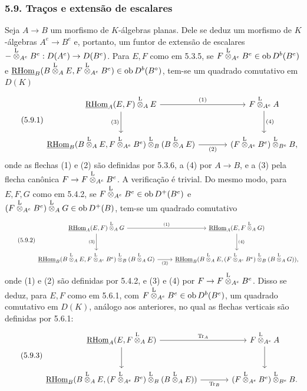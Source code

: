 \subsubsection*{5.9. Traços e extensão de escalares}

Seja $A\to B$ um morfismo de $K$-álgebras planas. Dele se deduz um morfismo de $K$-álgebras $A^e\to B^e$ e, portanto, um funtor de extensão de escalares $-\overset{\mathrm L}{\otimes}_{A^e}B^e:D(A^e)\to D(B^e)$. Para $E,F$ como em 5.3.5, se $F\overset{\mathrm L}{\otimes}_{A^e}B^e\in\operatorname{ob} D^b(B^e)$ e $\underline{\mathrm{RHom}}_B(B\overset{\mathrm L}{\otimes}_AE,F\overset{\mathrm L}{\otimes}_{A^e}B^e)\in\operatorname{ob} D^b(B^\circ)$, tem-se um quadrado comutativo em $D(K)$
\begin{equation}\tag{5.9.1}
\begin{tikzcd}[column sep=large,row sep=large]
\uRHom_A(E,F)\lten_AE \arrow[r,"(1)"] \arrow[d,"(3)"'] & F\lten_{A^e}A \arrow[d,"(4)"]\\
\uRHom_B(B\lten_AE,F\lten_{A^e}B^e)\lten_B(B\lten_AE) \arrow[r,"(2)"'] & (F\lten_{A^e}B^e)\lten_{B^e}B,
\end{tikzcd}
\end{equation}
onde as flechas (1) e (2) são definidas por 5.3.6, a (4) por $A\to B$, e a (3) pela flecha canônica $F\to F\overset{\mathrm L}{\otimes}_{A^e}B^e$. A verificação é trivial. Do mesmo modo, para $E,F,G$ como em 5.4.2, se $F\overset{\mathrm L}{\otimes}_{A^e}B^e\in\operatorname{ob} D^+(B^e)$ e $(F\overset{\mathrm L}{\otimes}_{A^e}B^e)\overset{\mathrm L}{\otimes}_AG\in\operatorname{ob} D^+(B)$, tem-se um quadrado comutativo
\begin{equation}\tag{5.9.2}
\begin{tikzcd}[column sep=normal,row sep=large]
\uRHom_A(E,F)\lten_AG \arrow[r,"(1)"] \arrow[d,"(3)"'] & \uRHom_A(E,F\lten_AG) \arrow[d,"(4)"]\\
\uRHom_B(B\lten_AE,F\lten_{A^e}B^e)\lten_B(B\lten_AG) \arrow[r,"(2)"'] & \uRHom_B(B\lten_AE,(F\lten_{A^e}B^e)\lten_B(B\lten_AG)),
\end{tikzcd}
\end{equation}
onde (1) e (2) são definidas por 5.4.2, e (3) e (4) por $F\to F\overset{\mathrm L}{\otimes}_{A^e}B^e$. Disso se deduz, para $E,F$ como em 5.6.1, com $F\overset{\mathrm L}{\otimes}_{A^e}B^e\in\operatorname{ob} D^b(B^e)$, um quadrado comutativo em $D(K)$, análogo aos anteriores, no qual as flechas verticais são definidas por 5.6.1:
\begin{equation}\tag{5.9.3}
\begin{tikzcd}[column sep=large,row sep=large]
\uRHom_A(E,F\lten_AE) \arrow[r,"\Tr_A"] \arrow[d] & F\lten_{A^e}A \arrow[d]\\
\uRHom_B(B\lten_AE,(F\lten_{A^e}B^e)\lten_B(B\lten_AE)) \arrow[r,"\Tr_B"'] & (F\lten_{A^e}B^e)\lten_{B^e}B.
\end{tikzcd}
\end{equation}
